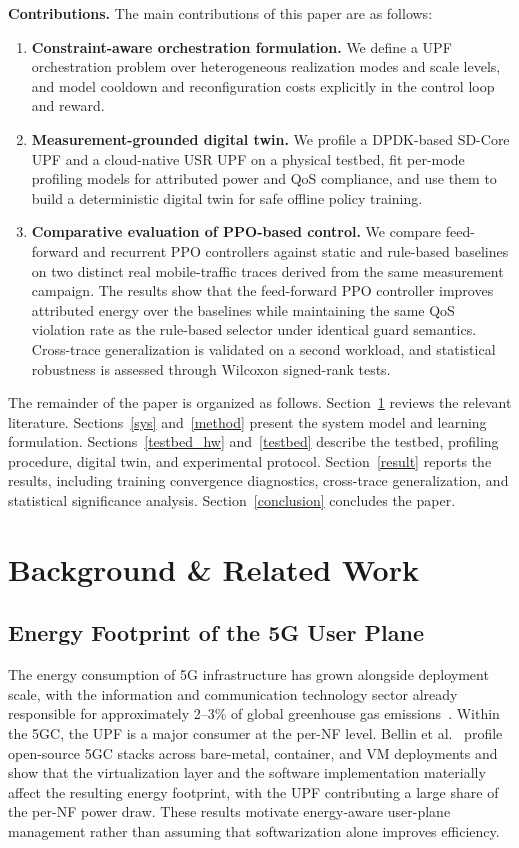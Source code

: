 \documentclass[a4paper,fleqn]{cas-sc}
\begin{document}
\textbf{Contributions.} The main contributions of this paper are as follows:
\begin{enumerate}
    \item \textbf{Constraint-aware orchestration formulation.} We define a UPF orchestration problem over heterogeneous realization modes and scale levels, and model cooldown and reconfiguration costs explicitly in the control loop and reward.
    \item \textbf{Measurement-grounded digital twin.} We profile a DPDK-based SD-Core UPF and a cloud-native USR UPF on a physical testbed, fit per-mode profiling models for attributed power and QoS compliance, and use them to build a deterministic digital twin for safe offline policy training.
    \item \textbf{Comparative evaluation of PPO-based control.} We compare feed-forward and recurrent PPO controllers against static and rule-based baselines on two distinct real mobile-traffic traces derived from the same measurement campaign. The results show that the feed-forward PPO controller improves attributed energy over the baselines while maintaining the same QoS violation rate as the rule-based selector under identical guard semantics. Cross-trace generalization is validated on a second workload, and statistical robustness is assessed through Wilcoxon signed-rank tests.
\end{enumerate}

The remainder of the paper is organized as follows. Section~\ref{related} reviews the relevant literature. Sections~\ref{sys} and~\ref{method} present the system model and learning formulation. Sections~\ref{testbed_hw} and~\ref{testbed} describe the testbed, profiling procedure, digital twin, and experimental protocol. Section~\ref{result} reports the results, including training convergence diagnostics, cross-trace generalization, and statistical significance analysis. Section~\ref{conclusion} concludes the paper.

\section{Background \& Related Work}
\label{related}

\subsection{Energy Footprint of the 5G User Plane}
\label{subsec:rel_energy}

The energy consumption of 5G infrastructure has grown alongside deployment scale, with the information and communication technology sector already responsible for approximately 2--3\% of global greenhouse gas emissions~\cite{freitag2021patterns}. Within the 5GC, the UPF is a major consumer at the per-NF level. Bellin et al.~\cite{bellin2023netsoft,bellin2024comnet} profile open-source 5GC stacks across bare-metal, container, and VM deployments and show that the virtualization layer and the software implementation materially affect the resulting energy footprint, with the UPF contributing a large share of the per-NF power draw. These results motivate energy-aware user-plane management rather than assuming that softwarization alone improves efficiency.
\end{document}
